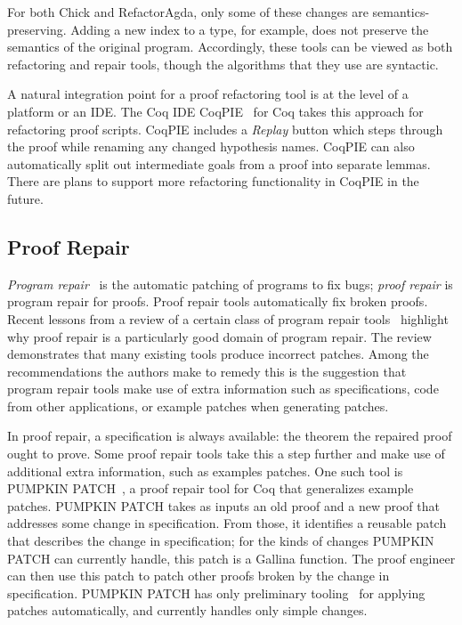 For both Chick and RefactorAgda, only some of these changes are semantics-preserving. Adding a new index to a type, for example, does not preserve the 
semantics of the original program. Accordingly, these tools can be viewed as both refactoring and repair tools,
though the algorithms that they use are syntactic.

A natural integration point for a proof refactoring tool is at the level of a platform or an IDE.
The Coq IDE CoqPIE~\citep{Roe2016} for Coq takes this approach for refactoring proof scripts.
CoqPIE includes a \textit{Replay} button which steps through the proof while renaming
any changed hypothesis names. CoqPIE can also automatically split out intermediate goals from a proof into separate lemmas. 
There are plans to support more refactoring functionality in CoqPIE in the future.

\subsection{Proof Repair}
\label{sec:repair}

\textit{Program repair}~\citep{Monperrus2018} is the automatic patching of programs to fix bugs;
\textit{proof repair} is program repair for proofs. Proof repair tools automatically fix broken proofs.
Recent lessons from a review of a certain class of program repair tools~\citep{Qi2015}
highlight why proof repair is a particularly good domain of program repair.
The review demonstrates that many existing tools produce incorrect patches.
Among the recommendations the authors make to remedy this is the suggestion that program repair tools
make use of extra information such as specifications, code from other applications, or example patches when generating patches.

In proof repair, a specification is always available: the theorem the repaired proof ought to prove.
Some proof repair tools take this a step further and make use of additional extra information, such as examples patches.
One such tool is \textsc{PUMPKIN PATCH}~\citep{Ringer2018}, a proof repair tool for Coq that generalizes example patches. 
\textsc{PUMPKIN PATCH} takes as inputs an old proof and a new proof that addresses some change in specification.
From those, it identifies a reusable patch that describes the change in specification;
for the kinds of changes \textsc{PUMPKIN PATCH} can currently handle, this patch is a Gallina function.
The proof engineer can then use this patch to patch other proofs broken by the change in specification.
\textsc{PUMPKIN PATCH} has only preliminary tooling~\citep{pumpkin-git} for applying patches automatically,
and currently handles only simple changes.

